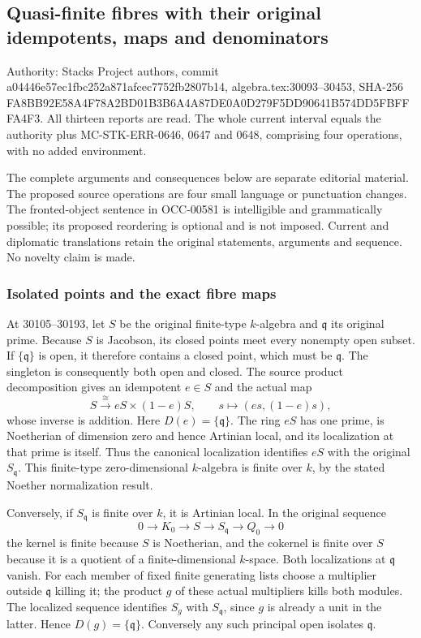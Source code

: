\subsection{Quasi-finite fibres with their original idempotents, maps and denominators}\label{algebra-proof-031-quasi-finite-fibres-with-their-original-idempotents-maps-and-denominators}

Authority: Stacks Project authors, commit a04446e57ec1fbc252a871afcec7752fb2807b14, algebra.tex:30093--30453, SHA-256 FA8BB92E58A4F78A2BD01B3B6A4A87DE0A0D279F5DD90641B574DD5FBFFFA4F3. All thirteen reports are read. The whole current interval equals the authority plus MC-STK-ERR-0646, 0647 and 0648, comprising four operations, with no added environment.

The complete arguments and consequences below are separate editorial material. The proposed source operations are four small language or punctuation changes. The fronted-object sentence in OCC-00581 is intelligible and grammatically possible; its proposed reordering is optional and is not imposed. Current and diplomatic translations retain the original statements, arguments and sequence. No novelty claim is made.

\subsubsection{Isolated points and the exact fibre maps}\label{algebra-proof-031-isolated-points-and-the-exact-fibre-maps}

At 30105--30193, let \(S\) be the original finite-type \(k\)-algebra and \(\mathfrak q\) its original prime. Because \(S\) is Jacobson, its closed points meet every nonempty open subset. If \(\{\mathfrak q\}\) is open, it therefore contains a closed point, which must be \(\mathfrak q\). The singleton is consequently both open and closed. The source product decomposition gives an idempotent \(e\in S\) and the actual map \[
 S\xrightarrow{\cong}eS\times(1-e)S,\qquad s\longmapsto(es,(1-e)s),
\] whose inverse is addition. Here \(D(e)=\{\mathfrak q\}\). The ring \(eS\) has one prime, is Noetherian of dimension zero and hence Artinian local, and its localization at that prime is itself. Thus the canonical localization identifies \(eS\) with the original \(S_{\mathfrak q}\). This finite-type zero-dimensional \(k\)-algebra is finite over \(k\), by the stated Noether normalization result.

Conversely, if \(S_{\mathfrak q}\) is finite over \(k\), it is Artinian local. In the original sequence \[
 0\to K_0\to S\to S_{\mathfrak q}\to Q_0\to0
\] the kernel is finite because \(S\) is Noetherian, and the cokernel is finite over \(S\) because it is a quotient of a finite-dimensional \(k\)-space. Both localizations at \(\mathfrak q\) vanish. For each member of fixed finite generating lists choose a multiplier outside \(\mathfrak q\) killing it; the product \(g\) of these actual multipliers kills both modules. The localized sequence identifies \(S_g\) with \(S_{\mathfrak q}\), since \(g\) is already a unit in the latter. Hence \(D(g)=\{\mathfrak q\}\). Conversely any such principal open isolates \(\mathfrak q\).

